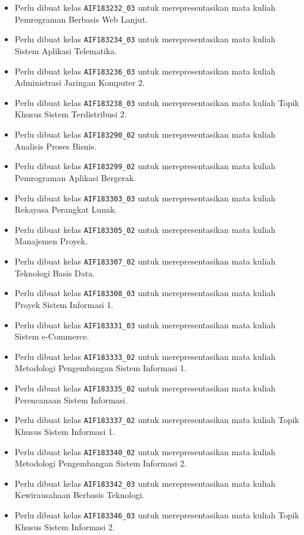 \begin{enumerate}
\begin{itemize}
		\item Perlu dibuat kelas \texttt{AIF183232\_03} untuk merepresentasikan mata kuliah Pemrograman Berbasis Web Lanjut.
		\item Perlu dibuat kelas \texttt{AIF183234\_03} untuk merepresentasikan mata kuliah Sistem Aplikasi Telematika.
		\item Perlu dibuat kelas \texttt{AIF183236\_03} untuk merepresentasikan mata kuliah Administrasi Jaringan Komputer 2.
		\item Perlu dibuat kelas \texttt{AIF183238\_03} untuk merepresentasikan mata kuliah Topik Khusus Sistem Terdistribusi 2.
		\item Perlu dibuat kelas \texttt{AIF183290\_02} untuk merepresentasikan mata kuliah Analisis Proses Bisnis.
		\item Perlu dibuat kelas \texttt{AIF183299\_02} untuk merepresentasikan mata kuliah Pemrograman Aplikasi Bergerak.
		\item Perlu dibuat kelas \texttt{AIF183303\_03} untuk merepresentasikan mata kuliah Rekayasa Perangkat Lunak.
		\item Perlu dibuat kelas \texttt{AIF183305\_02} untuk merepresentasikan mata kuliah Manajemen Proyek.
		\item Perlu dibuat kelas \texttt{AIF183307\_02} untuk merepresentasikan mata kuliah Teknologi Basis Data.
		\item Perlu dibuat kelas \texttt{AIF183308\_03} untuk merepresentasikan mata kuliah Proyek Sistem Informasi 1.
		\item Perlu dibuat kelas \texttt{AIF183331\_03} untuk merepresentasikan mata kuliah Sistem e-Commerce.
		\item Perlu dibuat kelas \texttt{AIF183333\_02} untuk merepresentasikan mata kuliah Metodologi Pengembangan Sistem Informasi 1.
		\item Perlu dibuat kelas \texttt{AIF183335\_02} untuk merepresentasikan mata kuliah Perencanaan Sistem Informasi.
		\item Perlu dibuat kelas \texttt{AIF183337\_02} untuk merepresentasikan mata kuliah Topik Khusus Sistem Informasi 1.
		\item Perlu dibuat kelas \texttt{AIF183340\_02} untuk merepresentasikan mata kuliah Metodologi Pengembangan Sistem Informasi 2.
		\item Perlu dibuat kelas \texttt{AIF183342\_03} untuk merepresentasikan mata kuliah Kewirausahaan Berbasis Teknologi.
		\item Perlu dibuat kelas \texttt{AIF183346\_03} untuk merepresentasikan mata kuliah Topik Khusus Sistem Informasi 2.

\end{itemize}
\end{enumerate}
